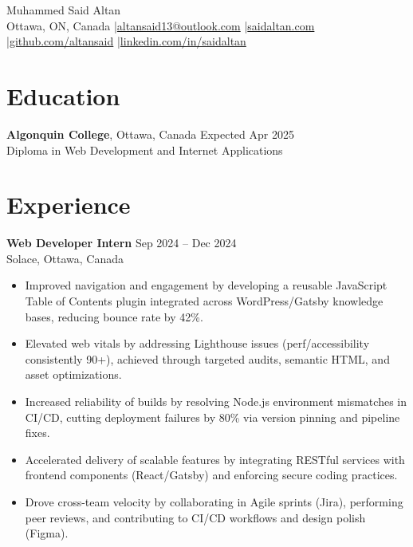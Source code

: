 \documentclass[10pt]{article}
\begin{document}
\begin{center}
{\LARGE Muhammed Said Altan}\\
Ottawa, ON, Canada \quad|\quad \href{mailto:altansaid13@outlook.com}{altansaid13@outlook.com} \quad|\quad \href{https://saidaltan.com}{saidaltan.com} \quad|\quad \href{https://github.com/altansaid}{github.com/altansaid} \quad|\quad \href{https://linkedin.com/in/saidaltan}{linkedin.com/in/saidaltan}
\end{center}

\section*{Education}
\textbf{Algonquin College}, Ottawa, Canada \hfill Expected Apr 2025\\
Diploma in Web Development and Internet Applications

\section*{Experience}
\textbf{Web Developer Intern} \hfill Sep 2024 -- Dec 2024\\
Solace, Ottawa, Canada
\begin{itemize}
  \item Improved navigation and engagement by developing a reusable JavaScript Table of Contents plugin integrated across WordPress/Gatsby knowledge bases, reducing bounce rate by 42\%.
  \item Elevated web vitals by addressing Lighthouse issues (perf/accessibility consistently 90+), achieved through targeted audits, semantic HTML, and asset optimizations.
  \item Increased reliability of builds by resolving Node.js environment mismatches in CI/CD, cutting deployment failures by 80\% via version pinning and pipeline fixes.
  \item Accelerated delivery of scalable features by integrating RESTful services with frontend components (React/Gatsby) and enforcing secure coding practices.
  \item Drove cross-team velocity by collaborating in Agile sprints (Jira), performing peer reviews, and contributing to CI/CD workflows and design polish (Figma).
\end{itemize}
\end{document}
